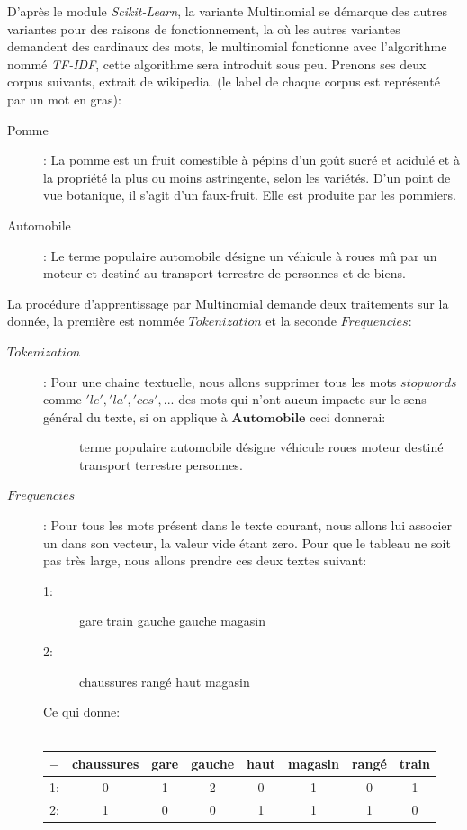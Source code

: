 D'après le module \textit{Scikit-Learn}, la variante Multinomial se démarque des autres variantes pour des raisons de fonctionnement, la où les autres variantes demandent des cardinaux des mots, le multinomial fonctionne avec l'algorithme nommé \textit{TF-IDF}, cette algorithme sera introduit sous peu.\linebreak
\linebreak
Prenons ses deux corpus suivants, extrait de wikipedia. (le label de chaque corpus est représenté par un mot en gras):\\
\begin{description}
\item[Pomme]: La pomme est un fruit comestible à pépins d'un goût sucré et acidulé et à la propriété la plus ou moins astringente, selon les variétés. D'un point de vue botanique, il s'agit d'un faux-fruit. Elle est produite par les pommiers.
\item[Automobile]: Le terme populaire automobile désigne un véhicule à roues mû par un moteur et destiné au transport terrestre de personnes et de biens.
\end{description}

\pagebreak

La procédure d'apprentissage par Multinomial demande deux traitements sur la donnée, la première est nommée $Tokenization$ et la seconde $Frequencies$:\\
\begin{description}
\item[$Tokenization$]: Pour une chaine textuelle, nous allons supprimer tous les mots $stopwords$ comme $'le','la','ces',...$ des mots qui n'ont aucun impacte sur le sens général du texte, si on applique à $\textbf{Automobile}$ ceci donnerai: 
\begin{description}
\item[] terme populaire automobile désigne véhicule roues moteur destiné transport terrestre personnes.
\end{description}

\item[$Frequencies$]: Pour tous les mots présent dans le texte courant, nous allons lui associer un dans son vecteur, la valeur vide étant zero. Pour que le tableau ne soit pas très large, nous allons prendre ces deux textes suivant: 
\begin{description}
\item[1:] gare train gauche gauche magasin
\item[2:] chaussures rangé haut magasin
\end{description}
Ce qui donne:\\\\
\begin{tabular}{c|c|c|c|c|c|c|c}
$-$ & chaussures & gare & gauche & haut & magasin & rangé & train\\
\hline
1: & 0 & 1 & 2 & 0 & 1 & 0 & 1\\
2: & 1 & 0 & 0 & 1 & 1 & 1 & 0\\
\end{tabular}
\end{description}

